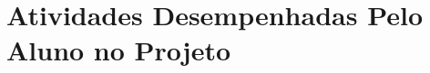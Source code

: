 \clearpage
\section[Atividades Desempenhadas Pelo Aluno no Projeto]{Atividades Desempenhadas Pelo Aluno no Projeto}






